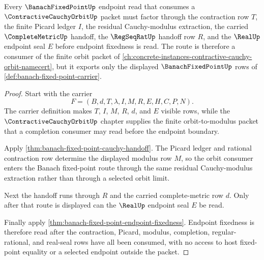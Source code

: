 \begin{theorem}
\label{thm:banach-fixed-point-contractive-orbit-handoff}
Every $\BanachFixedPointUp$ endpoint read that consumes a $\ContractiveCauchyOrbitUp$ packet must factor through the contraction row $T$, the finite Picard ledger $I$, the residual Cauchy-modulus extraction, the carried $\CompleteMetricUp$ handoff, the $\RegSeqRatUp$ handoff row $R$, and the $\RealUp$ endpoint seal $E$ before endpoint fixedness is read. The route is therefore a consumer of the finite orbit packet of \autoref{ch:concrete-instances-contractive-cauchy-orbit-namecert}, but it exports only the displayed $\BanachFixedPointUp$ rows of \autoref{def:banach-fixed-point-carrier}.
\end{theorem}
\begin{proof}
Start with the carrier
$$
F=(B,d,T,\lambda,I,M,R,E,H,C,P,N).
$$
The carrier definition makes $T$, $I$, $M$, $R$, $d$, and $E$ visible rows, while the $\ContractiveCauchyOrbitUp$ chapter supplies the finite orbit-to-modulus packet that a completion consumer may read before the endpoint boundary.

Apply \autoref{thm:banach-fixed-point-cauchy-handoff}. The Picard ledger and rational contraction row determine the displayed modulus row $M$, so the orbit consumer enters the Banach fixed-point route through the same residual Cauchy-modulus extraction rather than through a selected orbit limit.

Next the handoff runs through $R$ and the carried complete-metric row $d$. Only after that route is displayed can the $\RealUp$ endpoint seal $E$ be read.

Finally apply \autoref{thm:banach-fixed-point-endpoint-fixedness}. Endpoint fixedness is therefore read after the contraction, Picard, modulus, completion, regular-rational, and real-seal rows have all been consumed, with no access to host fixed-point equality or a selected endpoint outside the packet.
\end{proof}

